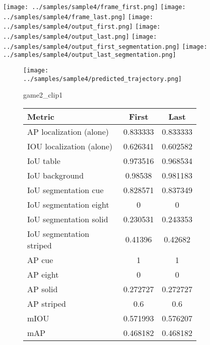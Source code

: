 \begin{figure}
    \texttt{[image: ../samples/sample4/frame\_first.png]}
    \texttt{[image: ../samples/sample4/frame\_last.png]}
    \newline
    \texttt{[image: ../samples/sample4/output\_first.png]}
    \texttt{[image: ../samples/sample4/output\_last.png]}
    \newline
    \texttt{[image: ../samples/sample4/output\_first\_segmentation.png]}
    \texttt{[image: ../samples/sample4/output\_last\_segmentation.png]}
    \newline
    \begin{subfigure}[b]{0.49\textwidth}
        \vspace{20pt}
        \texttt{[image: ../samples/sample4/predicted\_trajectory.png]}
        \caption*{game2\_clip1}
    \end{subfigure}
\begin{subfigure}[b]{0.49\textwidth}
    \begin{tabular}{|l|c|c|}
        \hline
        \textbf{Metric} & \textbf{First} & \textbf{Last} \\
        \hline
        AP localization (alone) & 0.833333 & 0.833333 \\ 
        IOU localization (alone) & 0.626341 & 0.602582 \\ 
        \hline
        IoU table & 0.973516 & 0.968534 \\ 
        IoU background & 0.98538 & 0.981183 \\ 
        \hline
        IoU segmentation cue & 0.828571 & 0.837349 \\ 
        IoU segmentation eight & 0 & 0 \\ 
        IoU segmentation solid & 0.230531 & 0.243353 \\ 
        IoU segmentation striped & 0.41396 & 0.42682 \\ 
        \hline
        AP cue & 1 & 1 \\ 
        AP eight & 0 & 0 \\ 
        AP solid & 0.272727 & 0.272727 \\ 
        AP striped & 0.6 & 0.6 \\ 
        \hline
        mIOU & 0.571993 & 0.576207 \\ 
        mAP & 0.468182 & 0.468182 \\ 
        \hline
    \end{tabular} 
\end{subfigure}
\end{figure}

